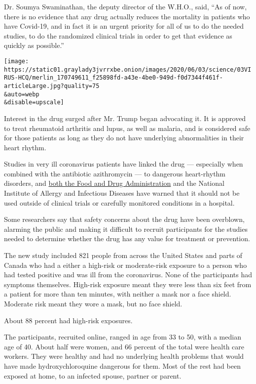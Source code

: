 Dr. Soumya Swaminathan, the deputy director of the W.H.O., said, ``As of
now, there is no evidence that any drug actually reduces the mortality
in patients who have Covid-19, and in fact it is an urgent priority for
all of us to do the needed studies, to do the randomized clinical trials
in order to get that evidence as quickly as possible.''

\texttt{[image: https://static01.graylady3jvrrxbe.onion/images/2020/06/03/science/03VIRUS-HCQ/merlin\_170749611\_f25898fd-a43e-4be0-949d-f0d7344f461f-articleLarge.jpg?quality=75\\\&auto=webp\\\&disable=upscale]}

Interest in the drug surged after Mr. Trump began advocating it. It is
approved to treat rheumatoid arthritis and lupus, as well as malaria,
and is considered safe for those patients as long as they do not have
underlying abnormalities in their heart rhythm.

Studies in very ill coronavirus patients have linked the drug ---
especially when combined with the antibiotic azithromycin --- to
dangerous heart-rhythm disorders, and
\href{https://www.nytimes3xbfgragh.onion/2020/04/24/health/fda-hydroxychloroquine-coronavirus.html}{both
the Food and Drug Administration} and the National Institute of Allergy
and Infectious Diseases have warned that it should not be used outside
of clinical trials or carefully monitored conditions in a hospital.

Some researchers say that safety concerns about the drug have been
overblown, alarming the public and making it difficult to recruit
participants for the studies needed to determine whether the drug has
any value for treatment or prevention.

The new study included 821 people from across the United States and
parts of Canada who had a either a high-risk or moderate-risk exposure
to a person who had tested positive and was ill from the coronavirus.
None of the participants had symptoms themselves. High-risk exposure
meant they were less than six feet from a patient for more than ten
minutes, with neither a mask nor a face shield. Moderate risk meant they
wore a mask, but no face shield.

About 88 percent had high-risk exposures.

The participants, recruited online, ranged in age from 33 to 50, with a
median age of 40. About half were women, and 66 percent of the total
were health care workers. They were healthy and had no underlying health
problems that would have made hydroxychloroquine dangerous for them.
Most of the rest had been exposed at home, to an infected spouse,
partner or parent.

